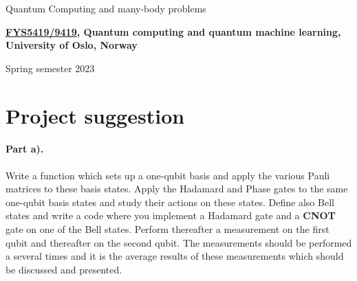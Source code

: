\documentclass[%
oneside,                 %
final,                   %
10pt]{article}
\begin{document}

\newcommand{\exercisesection}[1]{\subsection*{#1}}






\thispagestyle{empty}

\begin{center}
{\LARGE\bf
\begin{spacing}{1.25}
Quantum Computing and many-body problems
\end{spacing}
}
\end{center}


\begin{center}
{\bf \href{{https://www.uio.no/studier/emner/matnat/fys/FYS5419/index-eng.html}}{FYS5419/9419}, Quantum computing and quantum machine learning, University of Oslo, Norway${}^{}$} \\ [0mm]
\end{center}

\begin{center}
\end{center}
    

\begin{center}
Spring semester 2023
\end{center}

\vspace{1cm}


\section*{Project suggestion}

\paragraph{Part a).}
Write a function which sets up a one-qubit basis and apply the various
Pauli matrices to these basis states.  Apply the Hadamard and Phase
gates to the same one-qubit basis states and study their actions on
these states. Define also Bell states and write a code where you
implement a Hadamard gate and a \textbf{CNOT} gate on one of the Bell
states. Perform thereafter a measurement on the first qubit and
thereafter on the second qubit. The measurements should be performed a
several times and it is the average results of these measurements
which should be discussed and presented.
\end{document}
